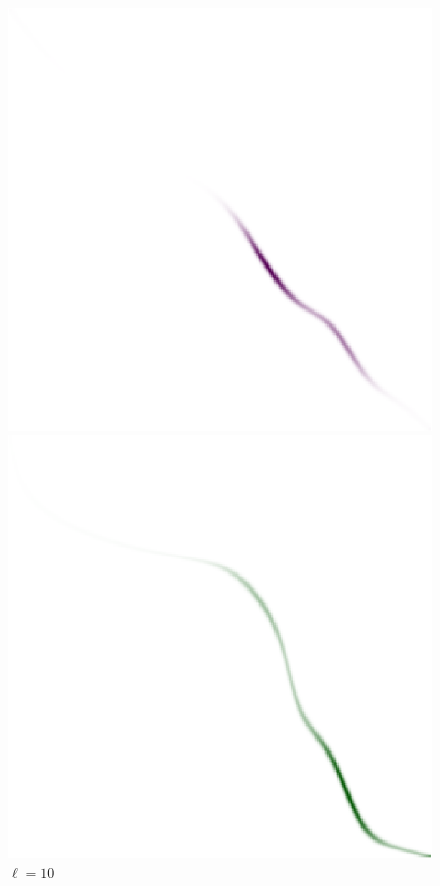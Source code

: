 \documentclass[cn,10pt,math=newtx,citestyle=gb7714-2015,bibstyle=gb7714-2015]{elegantbook}
\begin{document}
\begin{figure}[H]
\begin{minipage}{0.8\linewidth}
\begin{minipage}{0.16\linewidth}
\begin{mdframed}
		\end{mdframed}
		\caption*{$\ell=1$}
	\end{minipage}
	\begin{minipage}{0.16\linewidth}
		\centering
		\begin{mdframed}
		    \includegraphics[width=\linewidth]{figure/fig4.5/evol-img-3.eps}
		\end{mdframed}
		\caption*{$\ell=10$}
	\end{minipage}
	\begin{minipage}{0.16\linewidth}
		\centering
		\begin{mdframed}
		    \includegraphics[width=\linewidth]{figure/fig4.5/evol-img-4.eps}

\end{mdframed}
\end{minipage}
\end{minipage}
\end{figure}
\end{document}
